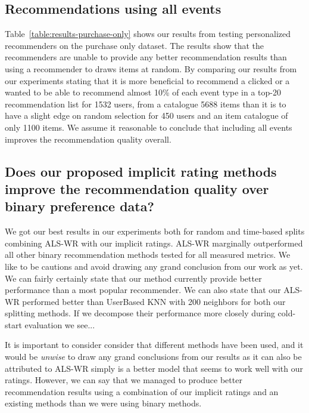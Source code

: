 \subsection{Recommendations using all events}

Table~\ref{table:results-purchase-only} shows our results from testing personalized recommenders on the purchase only dataset.
The results show that the recommenders are unable to provide any better recommendation results than using a recommender to draws
items at random. By comparing our results from our experiments stating that it is more beneficial to recommend a clicked or a wanted to be
able to recommend almost 10\% of each event type in a top-20 recommendation list for 1532 users, from a catalogue 5688 items than it is to
have a slight edge on random selection for 450 users and an item catalogue of only 1100 items. We assume it reasonable to conclude that including
all events improves the recommendation quality overall.

\subsection{Does our proposed implicit rating methods improve the recommendation quality over binary preference data?}

We got our best results in our experiments both for random and time-based splits combining ALS-WR with our implicit ratings.
ALS-WR marginally outperformed all other binary recommendation methods tested for all measured metrics.
We like to be cautions and avoid drawing any grand conclusion from our work as yet. We can fairly certainly state
that our method currently provide better performance than a most popular recommender. We can also state that
our ALS-WR performed better than UserBased KNN with 200 neighbors for 
both our splitting methods. If we decompose their performance more closely during cold-start evaluation we see...

It is important to consider consider that different methods have been used, and it would be \emph{unwise}
to draw any grand conclusions from our results as it can also be attributed to ALS-WR simply is a better
model that seems to work well with our ratings. However, we can say that we managed to produce better recommendation
results using a combination of our implicit ratings and an existing methods than we were using binary methods.

